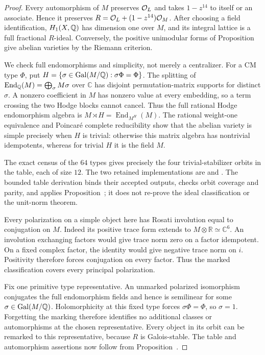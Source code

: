 \begin{proof}
Every automorphism of $M$ preserves $\mathcal O_L$ and takes $1-z^{14}$ to
itself or an associate. Hence it preserves $R=\mathcal O_L+(1-z^{14})\mathcal O_M$.
After choosing a field identification, $H_1(X,\mathbb Q)$ has dimension one
over $M$, and its integral lattice is a full fractional $R$-ideal.
Conversely, the positive unimodular forms of
Proposition~ give abelian varieties
by the Riemann criterion.

We check full endomorphisms and simplicity, not merely a centralizer.
For a CM type $\Phi$, put
$H=\{\sigma\in\operatorname{Gal}(M/\mathbb Q):\sigma\Phi=\Phi\}$.
The splitting of
$\operatorname{End}_{\mathbb Q}(M)=\bigoplus_\sigma M\sigma$
over $\mathbb C$ has disjoint permutation-matrix supports for distinct
$\sigma$. A nonzero coefficient in $M$ has nonzero value at every
embedding, so a term crossing the two Hodge blocks cannot cancel.
Thus the full rational Hodge endomorphism algebra is
$M\mathbin{\rtimes}H=\operatorname{End}_{M^H}(M)$.
The rational weight-one equivalence
\cite[Corollary~6.9]{MilneShimura2017} and Poincar\'e complete
reducibility show that the abelian variety is simple precisely when
$H$ is trivial: otherwise this matrix algebra has nontrivial
idempotents, whereas for trivial $H$ it is the field $M$.

The exact census of the $64$ types gives precisely the four
trivial-stabilizer orbits in the table, each of size $12$.
The two retained implementations are
 and
.
The bounded table derivation
binds their accepted outputs, checks orbit coverage and parity, and
applies Proposition~; it does not
re-prove the ideal classification or the unit-norm theorem.

Every polarization on a simple object here has Rosati involution
equal to conjugation on $M$. Indeed its positive trace form extends
to $M\otimes\mathbb R\simeq\mathbb C^6$. An involution exchanging
factors would give trace norm zero on a factor idempotent. On a fixed
complex factor, the identity would give negative trace norm on $i$.
Positivity therefore forces conjugation on every factor. Thus the
marked classification covers every principal polarization.

Fix one primitive type representative. An unmarked polarized
isomorphism conjugates the full endomorphism fields and hence is
semilinear for some $\sigma\in\operatorname{Gal}(M/\mathbb Q)$.
Holomorphicity at this fixed type forces $\sigma\Phi=\Phi$,
so $\sigma=1$. Forgetting the marking therefore identifies no
additional classes or automorphisms at the chosen representative.
Every object in its orbit can be remarked to this representative,
because $R$ is Galois-stable. The table and automorphism assertions
now follow from Proposition~.


\end{proof}
